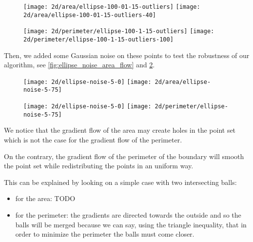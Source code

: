 \begin{figure}[h]
    \centering

    \texttt{[image: 2d/area/ellipse-100-01-15-outliers]}
    \texttt{[image: 2d/area/ellipse-100-01-15-outliers-40]}
    \label{fig:ellipse_outliers_area_flow}

    \texttt{[image: 2d/perimeter/ellipse-100-1-15-outliers]}
    \texttt{[image: 2d/perimeter/ellipse-100-1-15-outliers-100]}
    \label{fig:ellipse_outliers_perimeter_flow}
\end{figure}

Then, we added some Gaussian noise on these points to test the robustness of our
algorithm, see \ref{fig:ellipse_noise_area_flow} and
\ref{fig:ellipse_noise_perimeter_flow}.

\begin{figure}[h]
    \centering

    \texttt{[image: 2d/ellipse-noise-5-0]}
    \texttt{[image: 2d/area/ellipse-noise-5-75]}
    \label{fig:ellipse_noise_area_flow}

    \texttt{[image: 2d/ellipse-noise-5-0]}
    \texttt{[image: 2d/perimeter/ellipse-noise-5-75]}
    \label{fig:ellipse_noise_perimeter_flow}
\end{figure}

We notice that the gradient flow of the area may create holes in the point set
which is not the case for the gradient flow of the perimeter.

On the contrary, the gradient flow of the perimeter of the boundary will smooth
the point set while redistributing the points in an uniform way.

This can be explained by looking on a simple case with two intersecting balls:
\begin{itemize}
    \item for the area: TODO
    \item for the perimeter: the gradients are directed towards the outside
        and so the balls will be merged because we can say, using the triangle
        inequality, that in order to minimize the perimeter the balls must come
        closer.
\end{itemize}

